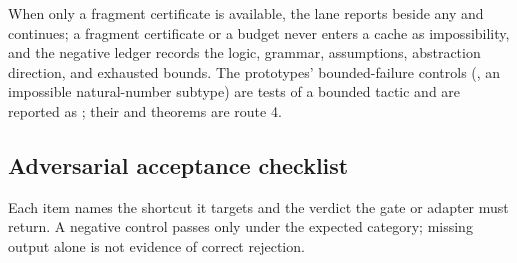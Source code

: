 When only a fragment certificate is available, the lane reports  beside any  and continues; a fragment certificate or a budget never enters a cache as impossibility, and the negative ledger records the logic, grammar, assumptions, abstraction direction, and exhausted bounds. The prototypes' bounded-failure controls (, an impossible natural-number subtype) are tests of a bounded tactic and are reported as ; their  and  theorems are route 4.

\subsection{Adversarial acceptance checklist}\label{alg:adversarial}

Each item names the shortcut it targets and the verdict the gate or adapter must return. A negative control passes only under the expected category; missing output alone is not evidence of correct rejection.

